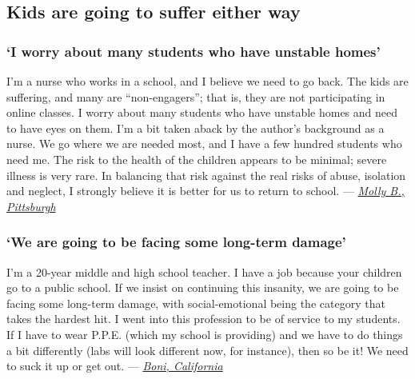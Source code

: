 \hypertarget{kids-are-going-to-suffer-either-way}{%
\subsection{Kids are going to suffer either
way}\label{kids-are-going-to-suffer-either-way}}

\hypertarget{i-worry-about-many-students-who-have-unstable-homes}{%
\subsubsection{`I worry about many students who have unstable
homes'}\label{i-worry-about-many-students-who-have-unstable-homes}}

I'm a nurse who works in a school, and I believe we need to go back. The
kids are suffering, and many are ``non-engagers''; that is, they are not
participating in online classes. I worry about many students who have
unstable homes and need to have eyes on them. I'm a bit taken aback by
the author's background as a nurse. We go where we are needed most, and
I have a few hundred students who need me. The risk to the health of the
children appears to be minimal; severe illness is very rare. In
balancing that risk against the real risks of abuse, isolation and
neglect, I strongly believe it is better for us to return to school. ---
\href{https://nyti.ms/39s7rsZ\#permid=108203959}{\emph{Molly B.,
Pittsburgh}}

\hypertarget{we-are-going-to-be-facing-some-long-term-damage}{%
\subsubsection{\texorpdfstring{`\textbf{We are going to be facing some
long-term
damage'}}{`We are going to be facing some long-term damage'}}\label{we-are-going-to-be-facing-some-long-term-damage}}

I'm a 20-year middle and high school teacher. I have a job because your
children go to a public school. If we insist on continuing this
insanity, we are going to be facing some long-term damage, with
social-emotional being the category that takes the hardest hit. I went
into this profession to be of service to my students. If I have to wear
P.P.E. (which my school is providing) and we have to do things a bit
differently (labs will look different now, for instance), then so be it!
We need to suck it up or get out. ---
\href{https://nyti.ms/3eTsCp2\#permid=108207697}{\emph{Boni,
California}}

